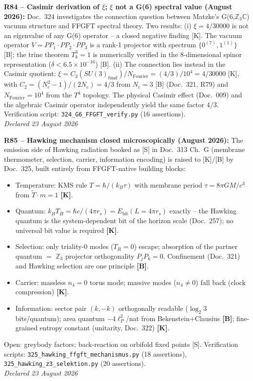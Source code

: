 \medskip
\textbf{R84 -- Casimir derivation of $\xi$; $\xi$ not a G(6) spectral value (August 2026):} Doc.~324 investigates the connection question between Matzke's G(6,$\mathbb{Z}_3\mathbb{C}$) vacuum structure and FFGFT spectral theory. Two results: (i) $\xi = 4/30000$ is not an eigenvalue of any G(6) operator -- a closed negative finding [K]. The vacuum operator $V = PP_1\cdot PP_2\cdot PP_3$ is a rank-1 projector with spectrum $\{0^{(7)}, 1^{(1)}\}$ [B]; the trine theorem $T_k^3 = 1$ is numerically verified in the 8-dimensional spinor representation ($\delta < 6.5\times10^{-16}$) [B]. (ii) The connection lies instead in the Casimir quotient: $\xi = C_2(SU(3)_{\mathrm{fund}})/N_{\mathrm{Fourier}} = (4/3)/10^4 = 4/30000$ [K], with $C_2 = (N_c^2-1)/(2N_c) = 4/3$ from $N_c = 3$ [B] (Doc.~321, R79) and $N_{\mathrm{Fourier}} = 10^4$ from the $T^4$ topology. The physical Casimir effect (Doc.~009) and the algebraic Casimir operator independently yield the same factor $4/3$. Verification script: \texttt{324\_G6\_FFGFT\_verify.py} (16 assertions).\\
\emph{Declared 23 August 2026}

\medskip
\textbf{R85 -- Hawking mechanism closed microscopically (August 2026):} The emission side of Hawking radiation booked as [S] in Doc.~313 Ch.~G (membrane thermometer, selection, carrier, information encoding) is raised to [K]/[B] by Doc.~325, built entirely from FFGFT-native building blocks:
\begin{itemize}
  \item Temperature: KMS rule $T = \hbar/(k_B\tau)$ with membrane period $\tau = 8\pi GM/c^3$ from $\widetilde{T}\cdot m = 1$ \textbf{[K]}.
  \item Quantum: $k_B T_H = \hbar c/(4\pi r_s) = E_{\mathrm{bit}}(L = 4\pi r_s)$ exactly -- the Hawking quantum is the system-dependent bit of the horizon scale (Doc.~257); no universal bit value is required \textbf{[K]}.
  \item Selection: only triality-0 modes ($T_R = 0$) escape; absorption of the partner quantum $=$ $\mathbb{Z}_3$ projector orthogonality $P_jP_k = 0$. Confinement (Doc.~321) and Hawking selection are one principle \textbf{[B]}.
  \item Carrier: massless $n_4{=}0$ torus mode; massive modes ($n_4 \neq 0$) fall back (clock compression) \textbf{[K]}.
  \item Information: sector pair $(k,-k)$ orthogonally readable ($\log_2 3$ bits/quantum); area quantum $-4\ell_P^2$/nat from Bekenstein$+$Clausius \textbf{[B]}; fine-grained entropy constant (unitarity, Doc.~322) \textbf{[K]}.
\end{itemize}
Open: greybody factors; back-reaction on orbifold fixed points [S]. Verification scripts: \texttt{325\_hawking\_ffgft\_mechanismus.py} (18 assertions), \texttt{325\_hawking\_z3\_selektion.py} (20 assertions).\\
\emph{Declared 23 August 2026}

\medskip
